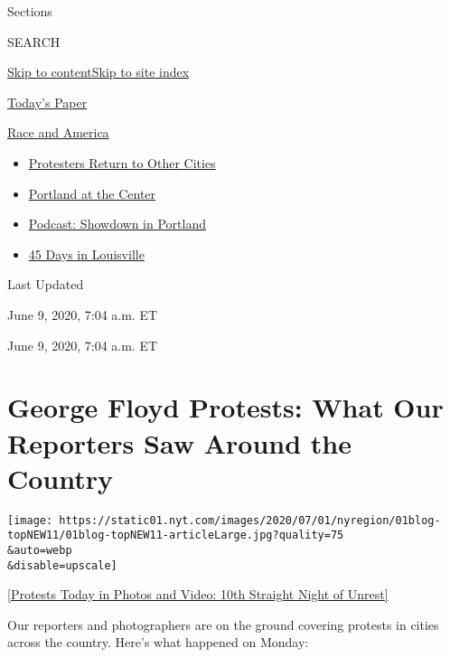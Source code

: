Sections

SEARCH

\protect\hyperlink{site-content}{Skip to
content}\protect\hyperlink{site-index}{Skip to site index}

\href{https://myaccount.nytimes.com/auth/login?response_type=cookie\&client_id=vi}{}

\href{https://www.nytimes.com/section/todayspaper}{Today's Paper}

\href{https://www.nytimes.com/news-event/george-floyd-protests-minneapolis-new-york-los-angeles}{Race
and America}

\begin{itemize}
\tightlist
\item
  \href{https://www.nytimes.com/2020/07/26/us/protests-portland-seattle-trump.html}{Protesters
  Return to Other Cities}
\item
  \href{https://www.nytimes.com/2020/07/24/us/portland-oregon-protests-white-race.html}{Portland
  at the Center}
\item
  \href{https://www.nytimes.com/2020/07/23/podcasts/the-daily/portland-protests.html}{Podcast:
  Showdown in Portland}
\item
  \href{https://www.nytimes.com/interactive/2020/07/16/us/black-lives-matter-protests-louisville-breonna-taylor.html}{45
  Days in Louisville}
\end{itemize}

Last Updated

June 9, 2020, 7:04 a.m. ET

June 9, 2020, 7:04 a.m. ET

\hypertarget{george-floyd-protests-what-our-reporters-saw-around-the-country}{%
\section{George Floyd Protests: What Our Reporters Saw Around the
Country}\label{george-floyd-protests-what-our-reporters-saw-around-the-country}}

\texttt{[image: https://static01.nyt.com/images/2020/07/01/nyregion/01blog-topNEW11/01blog-topNEW11-articleLarge.jpg?quality=75\\\&auto=webp\\\&disable=upscale]}

\href{https://www.nytimes.com/live/2020/george-floyd-protests-photos-videos-06-04}{{[}Protests
Today in Photos and Video: 10th Straight Night of Unrest{]}}

Our reporters and photographers are on the ground covering protests in
cities across the country. Here's what happened on Monday:

